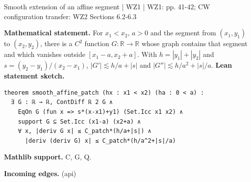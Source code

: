 \documentclass[10pt,a4paper]{article}
\newcommand{\nodecard}[1]{\hyperlink{node-#1}{\texttt{\detokenize{#1}}}}
\begin{document}
\begin{minipage}{\linewidth}
\hypertarget{node-L5_8}{}
\begin{tcolorbox}[colback=white,colframe=regularityfg,colbacktitle=regularitybg,coltitle=ink,boxrule=0.45pt,arc=1.6mm,left=3mm,right=3mm,top=2mm,bottom=2mm,title={\sffamily\bfseries WZ1 Lemma 5.8 \hfill \texttt{L5\_8}}]
{\sffamily\small\color{muted}Smooth extension of an affine segment | WZ1 | WZ1: pp. 41-42; CW configuration transfer: WZ2 Sections 6.2-6.3}\par
\textbf{Mathematical statement.} For $x_1<x_2$, $a>0$ and the segment from $(x_1,y_1)$ to $(x_2,y_2)$, there is a $C^2$ function $G:\mathbb R\to\mathbb R$ whose graph contains that segment and which vanishes outside $[x_1-a,x_2+a]$.
With $h=|y_1|+|y_2|$ and $s=(y_2-y_1)/(x_2-x_1)$,
$|G'|\lesssim h/a+|s|$ and $|G''|\lesssim h/a^2+|s|/a$.
\smallskip\textbf{Lean statement sketch.}
\begin{Verbatim}[fontsize=\small,breaklines=true,breakanywhere=true,tabsize=2]
theorem smooth_affine_patch (hx : x1 < x2) (ha : 0 < a) :
  ∃ G : ℝ → ℝ, ContDiff ℝ 2 G ∧
    EqOn G (fun x => s*(x-x1)+y1) (Set.Icc x1 x2) ∧
    support G ⊆ Set.Icc (x1-a) (x2+a) ∧
    ∀ x, |deriv G x| ≤ C_patch*(h/a+|s|) ∧
      |deriv (deriv G) x| ≤ C_patch*(h/a^2+|s|/a)
\end{Verbatim}
{\footnotesize\textbf{Mathlib support.} C, G, Q.\par
\textbf{Incoming edges.} \nodecard{Icalc} (api)\par}

\end{tcolorbox}\end{minipage}\par\medskip
\end{document}
